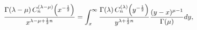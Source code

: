 \[\frac{\mathop{\Gamma\/}\nolimits\!\left(\lambda-\mu\right)\mathop{C^{(\lambda-%
\mu)}_{n}\/}\nolimits\!\left(x^{-\frac{1}{2}}\right)}{x^{\lambda-\mu+\frac{1}{%
2}n}}=\int_{x}^{\infty}\frac{\mathop{\Gamma\/}\nolimits\!\left(\lambda\right)%
\mathop{C^{(\lambda)}_{n}\/}\nolimits\!\left(y^{-\frac{1}{2}}\right)}{y^{%
\lambda+\frac{1}{2}n}}\frac{(y-x)^{\mu-1}}{\mathop{\Gamma\/}\nolimits\!\left(%
\mu\right)}dy,\]